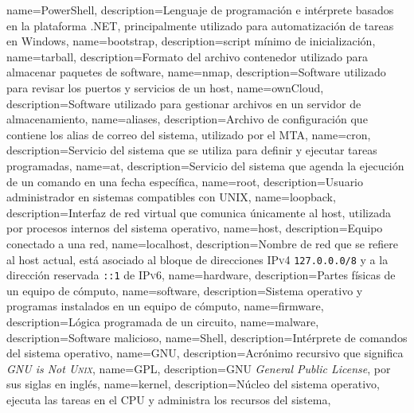 {
  name={PowerShell},
  description={Lenguaje de programaci\'{o}n e int\'{e}rprete basados en la plataforma .NET, principalmente utilizado para automatizaci\'{o}n de tareas en Windows},
}
{
  name={bootstrap},
  description={\Gls{script} m\'{i}nimo de inicializaci\'{o}n},
}
{
  name={tarball},
  description={Formato del archivo contenedor utilizado para almacenar paquetes de software},
}
{
  name={nmap},
  description={\Gls{Software} utilizado para revisar los puertos y servicios de un \gls{host}},
}
{
  name={ownCloud},
  description={\Gls{Software} utilizado para gestionar archivos en un servidor de almacenamiento},
}
{
  name={aliases},
  description={Archivo de configuraci\'{o}n que contiene los alias de correo del sistema, utilizado por el \gls{MTA}},
}
{
  name={cron},
  description={Servicio del sistema que se utiliza para definir y ejecutar tareas programadas},
}
{
  name={at},
  description={Servicio del sistema que agenda la ejecuci\'{o}n de un comando en una fecha espec\'{i}fica},
}
{
  name={root},
  description={Usuario administrador en sistemas compatibles con \textsc{UNIX}},
}
{
  name={loopback},
  description={Interfaz de red virtual que comunica \'{u}nicamente al \gls{host}, utilizada por procesos internos del sistema operativo},
}
{
  name={host},
  description={Equipo conectado a una red},
}
{
  name={localhost},
  description={Nombre de red que se refiere al \gls{host} actual, est\'{a} asociado al bloque de direcciones \textsc{IPv4} \texttt{127.0.0.0/8} y a la direcci\'{o}n reservada \texttt{::1} de \textsc{IPv6}},
}
{
  name={hardware},
  description={Partes f\'{i}sicas de un equipo de c\'{o}mputo},
}
{
  name={software},
  description={Sistema operativo y programas instalados en un equipo de c\'{o}mputo},
}
{
  name={firmware},
  description={L\'{o}gica programada de un circuito},
}
{
  name={malware},
  description={\Gls{Software} malicioso},
}
{
  name={Shell},
  description={Int\'{e}rprete de comandos del sistema operativo},
}
{
  name={GNU},
  description={Acr\'{o}nimo recursivo que significa \textit{GNU is Not \textsc{Unix}}},
}
{
  name={GPL},
  description={\gls{GNU} \textit{General Public License}, por sus siglas en ingl\'{e}s},
}
{
  name=kernel,
  description={N\'{u}cleo del sistema operativo, ejecuta las tareas en el CPU y administra los recursos del sistema},
}
